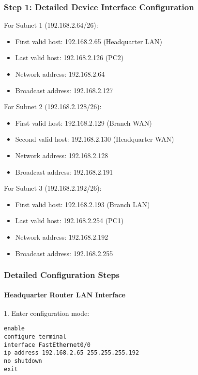 \documentclass[12pt]{article}
\begin{document}
\subsubsection{Step 1: Detailed Device Interface Configuration}

For Subnet 1 (192.168.2.64/26):
\begin{itemize}
    \item First valid host: 192.168.2.65 (Headquarter LAN)
    \item Last valid host: 192.168.2.126 (PC2)
    \item Network address: 192.168.2.64
    \item Broadcast address: 192.168.2.127
\end{itemize}

For Subnet 2 (192.168.2.128/26):
\begin{itemize}
    \item First valid host: 192.168.2.129 (Branch WAN)
    \item Second valid host: 192.168.2.130 (Headquarter WAN)
    \item Network address: 192.168.2.128
    \item Broadcast address: 192.168.2.191
\end{itemize}

For Subnet 3 (192.168.2.192/26):
\begin{itemize}
    \item First valid host: 192.168.2.193 (Branch LAN)
    \item Last valid host: 192.168.2.254 (PC1)
    \item Network address: 192.168.2.192
    \item Broadcast address: 192.168.2.255
\end{itemize}

\subsubsection{Detailed Configuration Steps}

\paragraph{Headquarter Router LAN Interface}
1. Enter configuration mode:
\begin{lstlisting}[frame=single]
enable
configure terminal
interface FastEthernet0/0
ip address 192.168.2.65 255.255.255.192
no shutdown
exit
\end{lstlisting}
\end{document}
